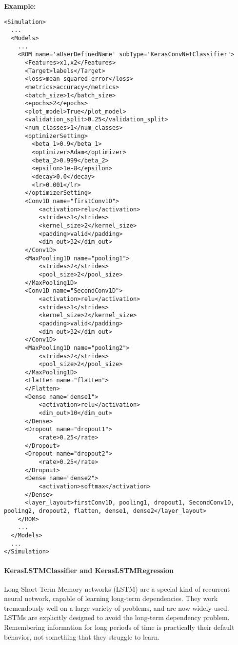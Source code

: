 \textbf{Example:}
\begin{lstlisting}[style=XML,morekeywords={name,subType}]
<Simulation>
  ...
  <Models>
    ...
    <ROM name='aUserDefinedName' subType='KerasConvNetClassifier'>
      <Features>x1,x2</Features>
      <Target>labels</Target>
      <loss>mean_squared_error</loss>
      <metrics>accuracy</metrics>
      <batch_size>1</batch_size>
      <epochs>2</epochs>
      <plot_model>True</plot_model>
      <validation_split>0.25</validation_split>
      <num_classes>1</num_classes>
      <optimizerSetting>
        <beta_1>0.9</beta_1>
        <optimizer>Adam</optimizer>
        <beta_2>0.999</beta_2>
        <epsilon>1e-8</epsilon>
        <decay>0.0</decay>
        <lr>0.001</lr>
      </optimizerSetting>
      <Conv1D name="firstConv1D">
          <activation>relu</activation>
          <strides>1</strides>
          <kernel_size>2</kernel_size>
          <padding>valid</padding>
          <dim_out>32</dim_out>
      </Conv1D>
      <MaxPooling1D name="pooling1">
          <strides>2</strides>
          <pool_size>2</pool_size>
      </MaxPooling1D>
      <Conv1D name="SecondConv1D">
          <activation>relu</activation>
          <strides>1</strides>
          <kernel_size>2</kernel_size>
          <padding>valid</padding>
          <dim_out>32</dim_out>
      </Conv1D>
      <MaxPooling1D name="pooling2">
          <strides>2</strides>
          <pool_size>2</pool_size>
      </MaxPooling1D>
      <Flatten name="flatten">
      </Flatten>
      <Dense name="dense1">
          <activation>relu</activation>
          <dim_out>10</dim_out>
      </Dense>
      <Dropout name="dropout1">
          <rate>0.25</rate>
      </Dropout>
      <Dropout name="dropout2">
          <rate>0.25</rate>
      </Dropout>
      <Dense name="dense2">
          <activation>softmax</activation>
      </Dense>
      <layer_layout>firstConv1D, pooling1, dropout1, SecondConv1D, pooling2, dropout2, flatten, dense1, dense2</layer_layout>
    </ROM>
    ...
  </Models>
  ...
</Simulation>
\end{lstlisting}

\paragraph{KerasLSTMClassifier and KerasLSTMRegression}
\label{KerasClassifier}

Long Short Term Memory networks (LSTM) are a special kind of recurrent neural network, capable
of learning long-term dependencies. They work tremendously well on a large variety of problems, and
are now widely used. LSTMs are explicitly designed to avoid the long-term dependency problem. Remembering
information for long periods of time is practically their default behavior, not something that they
struggle to learn.

